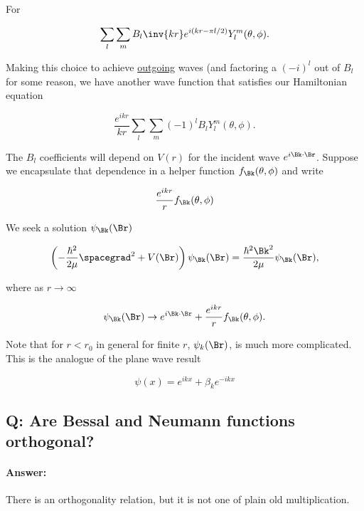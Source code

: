 For 

\begin{equation}\label{eqn:qmTwoL23:540}
\sum_l 
\sum_m B_l
\inv{k r} e^{i (k r - \pi l/2)} Y_l^m(\theta, \phi).
\end{equation}

Making this choice to achieve \underline{outgoing} waves (and factoring a $(-i)^l$ out of $B_l$ for some reason, we have another wave function that satisfies our Hamiltonian equation

\begin{equation}\label{eqn:qmTwoL23:560}
\frac{e^{i k r}}{k r} 
\sum_l 
\sum_m 
(-1)^l
B_l
Y_l^m(\theta, \phi).
\end{equation}

The $B_l$ coefficients will depend on $V(r)$ for the incident wave $e^{i \Bk \cdot \Br}$.  Suppose we encapsulate that dependence in a helper function $f_\Bk(\theta, \phi)$ and write

\begin{equation}\label{eqn:qmTwoL23:580}
\frac{e^{i k r}}{r} f_\Bk(\theta, \phi)
\end{equation}

We seek a solution $\psi_\Bk(\Br)$ 

\begin{equation}\label{eqn:qmTwoL23:60}
\left( - \frac{\hbar^2}{2\mu} \spacegrad^2 
+ V(\Br)
\right)
\psi_\Bk(\Br)
 = \frac{\hbar^2 \Bk^2}{2 \mu} 
\psi_\Bk(\Br),
\end{equation}

where as $r \rightarrow \infty$ 

\begin{equation}\label{eqn:qmTwoL23:600}
\psi_\Bk(\Br) \rightarrow e^{i \Bk \cdot \Br} + \frac{e^{i k r}}{r} f_\Bk(\theta, \phi).
\end{equation}

Note that for $r < r_0$ in general for finite $r$, $\psi_k(\Br)$, is much more complicated.  This is the analogue of the plane wave result

\begin{equation}\label{eqn:qmTwoL23:620}
\psi(x) = e^{i k x} + \beta_k e^{-i k x}
\end{equation}

\subsection{Q: Are Bessal and Neumann functions orthogonal?}

\paragraph{Answer:} There is an orthogonality relation, but it is not one of plain old multiplication.

